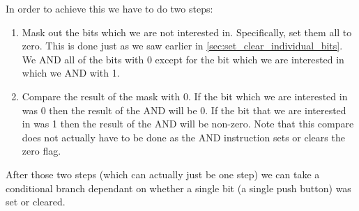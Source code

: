 In order to achieve this we have to do two steps:
\begin{enumerate}
\item Mask out the bits which we are not interested in. Specifically, set them all to zero. This is done just as we saw earlier in \autoref{sec:set_clear_individual_bits}. We AND all of the bits with 0 except for the bit which we are interested in which we AND with 1.
\item Compare the result of the mask with 0. If the bit which we are interested in was 0 then the result of the AND will be 0. If the bit that we are interested in was 1 then the result of the AND will be non-zero. Note that this compare does not actually have to be done as the AND instruction sets or clears the zero flag.
\end{enumerate}
After those two steps (which can actually just be one step) we can take a conditional branch dependant on whether a single bit (a single push button) was set or cleared. 
